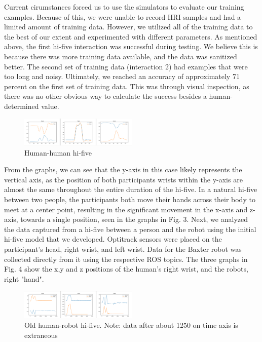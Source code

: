 \documentclass[letterpaper, 10 pt, conference]{ieeeconf}  %
\begin{document}
Current cirumstances forced us to use the simulators to evaluate our training examples. Because of this, we were unable to record HRI samples and had a limited amount of training data. However, we utilized all of the training data to the best of our extent and experimented with different parameters. As mentioned above, the first hi-five interaction was successful during testing. We believe this is because there was more training data available, and the data was sanitized better. The second set of training data (interaction 2) had examples that were too long and noisy. Ultimately, we reached an accuracy of approximately 71 percent on the first set of training data. This was through visual inspection, as there was no other obvious way to calculate the success besides a human-determined value.
\begin{figure}[h]
\centering
\includegraphics[width=0.5\textwidth]{biomechanics.png}
\caption{Human-human hi-five}
\end{figure} 
\newline
\indent From the graphs, we can see that the y-axis in this case likely represents the vertical axis, as the position of both participants wrists within the y-axis are almost the same throughout the entire duration of the hi-five. In a natural hi-five between two people, the participants both move their hands across their body to meet at a center point, resulting in the significant movement in the x-axis and z-axis, towards a single position, seen in the graphs in Fig. 3.
\newline
\indent Next, we analyzed the data captured from a hi-five between a person and the robot using the initial hi-five model that we developed. Optitrack sensors were placed on the participant's head, right wrist, and left wrist. Data for the Baxter robot was collected directly from it using the respective ROS topics. The three graphs in Fig. 4 show the x,y and z positions of the human's right wrist, and the robots, right "hand".
\begin{figure}[h]
\centering
\includegraphics[width=0.5\textwidth]{oldfive.png}
\caption{Old human-robot hi-five. Note: data after about 1250 on time axis is extraneous}
\end{figure}
\end{document}
